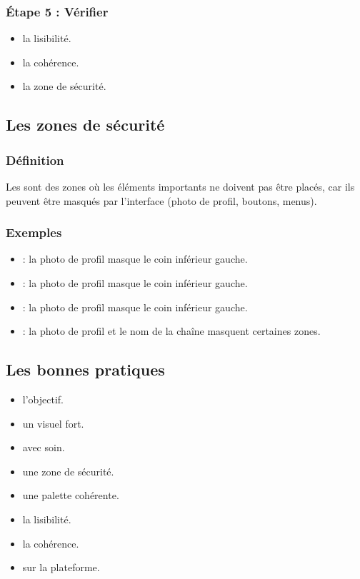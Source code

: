 \subsubsection{Étape 5 : Vérifier}

\begin{itemize}
    \item {} la lisibilité.
    \item {} la cohérence.
    \item {} la zone de sécurité.
\end{itemize}

\subsection{Les zones de sécurité}

\subsubsection{Définition}

Les  sont des zones où les éléments importants ne doivent pas être placés, car ils peuvent être masqués par l'interface (photo de profil, boutons, menus).

\subsubsection{Exemples}

\begin{itemize}
    \item {} : la photo de profil masque le coin inférieur gauche.
    \item {} : la photo de profil masque le coin inférieur gauche.
    \item {} : la photo de profil masque le coin inférieur gauche.
    \item {} : la photo de profil et le nom de la chaîne masquent certaines zones.
\end{itemize}

\subsection{Les bonnes pratiques}

\begin{itemize}
    \item {} l'objectif.
    \item {} un visuel fort.
    \item {} avec soin.
    \item {} une zone de sécurité.
    \item {} une palette cohérente.
    \item {} la lisibilité.
    \item {} la cohérence.
    \item {} sur la plateforme.
\end{itemize}

